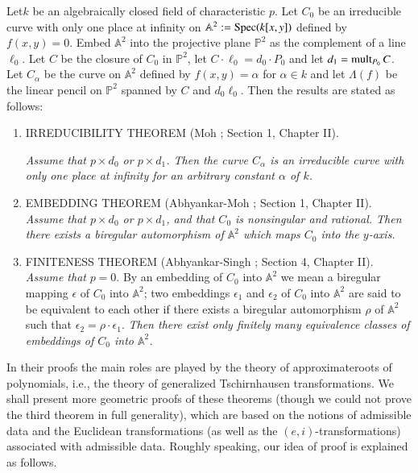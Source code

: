 Let\pageoriginale $k$ be an algebraically closed field of
characteristic $p$. Let $C_{0}$ be an irreducible curve with only one
place at infinity on $\mathbb{A}^{2}:=\operatorname{Spec}(k[x,y])$ defined by
$f(x,y)=0$. Embed $\mathbb{A}^{2}$ into the projective plane
$\mathbb{P}^{2}$ as the complement of a line $\ell_{0}$. Let $C$ be
the closure of $C_{0}$ in $\mathbb{P}^{2}$, let
$C\cdot\ell_{0}=d_{0}\cdot P_{0}$ and let $d_{1}=\operatorname{mult}_{P_{0}}C$. Let
$C_{\alpha}$ be the curve on $\mathbb{A}^{2}$ defined by
$f(x,y)=\alpha$ for $\alpha\in k$ and let $\Lambda(f)$ be the linear
pencil on $\mathbb{P}^{2}$ spanned by $C$ and $d_{0}\ell_{0}$. Then
the results are stated as follows:
\begin{enumerate}
\renewcommand{\theenumi}{\roman{enumi}}
\renewcommand{\labelenumi}{(\theenumi)}
\item IRREDUCIBILITY THEOREM (Moh \cite{38}; \cf Section 1, Chapter
  II).

{\em Assume that $p\times d_{0}$ or $p\times d_{1}$. Then the curve
  $C_{\alpha}$ is an irreducible curve with only one place at infinity
for an arbitrary constant $\alpha$ of $k$.}

\item EMBEDDING THEOREM (Abhyankar-Moh \cite{2}; \cf Section 1,
  Chapter II). {\em Assume that $p\times d_{0}$ or $p\times d_{1}$,
    and that $C_{0}$ is nonsingular and rational. Then there exists a
    biregular automorphism of $\mathbb{A}^{2}$ which maps $C_{0}$ into
    the $y$-axis.}

\item FINITENESS THEOREM (Abhyankar-Singh \cite{3}; \cf Section 4,
  Chapter II). {\em Assume that} $p=0$. By an embedding of $C_{0}$
  into $\mathbb{A}^{2}$ we mean a biregular mapping $\epsilon$ of
  $C_{0}$ into $\mathbb{A}^{2}$; two embeddings $\epsilon_{1}$ and
  $\epsilon_{2}$ of $C_{0}$ into $\mathbb{A}^{2}$ are said to be
  equivalent to each other if there exists a biregular automorphism
  $\rho$ of $\mathbb{A}^{2}$ such that $\epsilon_{2}=\rho\cdot
  \epsilon_{1}$. {\em Then there exist only finitely many equivalence
    classes of embeddings of $C_{0}$ into $\mathbb{A}^{2}$.}
\end{enumerate}

In their proofs the main roles are played by the theory of
approximate\pageoriginale roots of polynomials, i.e., the theory of
generalized Tschirnhausen transformations. We shall present more
geometric proofs of these theorems (though we could not prove the
third theorem in full generality), which are based on the notions of
admissible data and the Euclidean transformations (as well as the
$(e,i)$-transformations) associated with admissible data. Roughly
speaking, our idea of proof is explained as follows.

